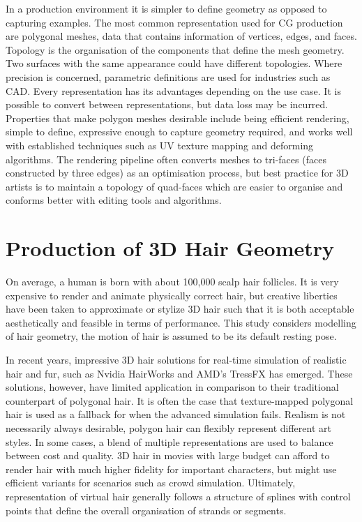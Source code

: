 \documentclass[ %
                    author={Dillon Keith Diep},
                supervisor={Dr. Carl Henrik Ek},
                    degree={MEng},
                     title={Assisted Content Generation for 3D Hair Geometry},
                  subtitle={[INCOMPLETE DRAFT, CONTAINS NOTES FROM RESEARCH]},
                      type={Research},
                      year={2014} ]{dissertation}
\begin{document}
In a production environment it is simpler to define geometry as opposed to capturing examples. The most common representation used for CG production are polygonal meshes, data that contains information of vertices, edges, and faces. Topology is the organisation of the components that define the mesh geometry. Two surfaces with the same appearance could have different topologies. Where precision is concerned, parametric definitions are used for industries such as CAD. Every representation has its advantages depending on the use case. It is possible to convert between representations, but data loss may be incurred. Properties that make polygon meshes desirable include being efficient rendering, simple to define, expressive enough to capture geometry required, and works well with established techniques such as UV texture mapping and deforming algorithms. The rendering pipeline often converts meshes to tri-faces (faces constructed by three edges) as an optimisation process, but best practice for 3D artists is to maintain a topology of quad-faces which are easier to organise and conforms better with editing tools and algorithms.


\section{Production of 3D Hair Geometry}
\noindent
On average, a human is born with about 100,000 scalp hair follicles. It is very expensive to render and animate physically correct hair, but creative liberties have been taken to approximate or stylize 3D hair such that it is both acceptable aesthetically and feasible in terms of performance. This study considers modelling of hair geometry, the motion of hair is assumed to be its default resting pose.

In recent years, impressive 3D hair solutions for real-time simulation of realistic hair and fur, such as Nvidia HairWorks and AMD’s TressFX has emerged. These solutions, however, have limited application in comparison to their traditional counterpart of polygonal hair. It is often the case that texture-mapped polygonal hair is used as a fallback for when the advanced simulation fails. Realism is not necessarily always desirable, polygon hair can flexibly represent different art styles. In some cases, a blend of multiple representations are used to balance between cost and quality. 3D hair in movies with large budget can afford to render hair with much higher fidelity for important characters, but might use efficient variants for scenarios such as crowd simulation. Ultimately, representation of virtual hair generally follows a structure of splines with control points that define the overall organisation of strands or segments.
\end{document}
